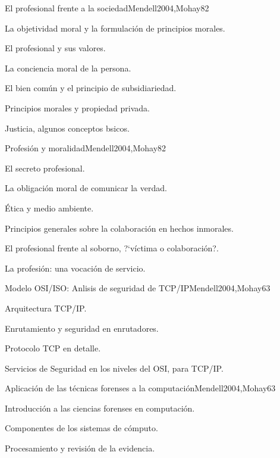\begin{syllabus}
\begin{unit}{El profesional frente a la sociedad}{Mendell2004,Mohay}{8}{2}
\begin{topics}
      \item {La objetividad moral y la formulación de principios morales.}
      \item {El profesional y sus valores.}
      \item {La conciencia moral de la persona.}
      \item {El bien común y el principio de subsidiariedad.}
      \item {Principios morales y propiedad privada.}
      \item {Justicia, algunos conceptos bsicos.}
\end{topics}
\end{unit}

\begin{unit}{Profesión y moralidad}{Mendell2004,Mohay}{8}{2}
\begin{topics}
      \item {El secreto profesional.}
      \item {La obligación moral de comunicar la verdad.}
      \item {Ética y medio ambiente.}
      \item {Principios generales sobre la colaboración en hechos inmorales.}
      \item {El profesional frente al soborno, ?`víctima o colaboración?.}
      \item {La profesión: una vocación de servicio.}
\end{topics}
\end{unit}

\begin{unit}{Modelo OSI/ISO: Anlisis de seguridad de TCP/IP}{Mendell2004,Mohay}{6}{3}
\begin{topics}
      \item {Arquitectura TCP/IP.}
      \item {Enrutamiento y seguridad en enrutadores.}
      \item {Protocolo TCP en detalle.}
      \item {Servicios de Seguridad en los niveles del OSI, para TCP/IP.}
\end{topics}
\end{unit}

\begin{unit}{Aplicación de las técnicas forenses a la computación}{Mendell2004,Mohay}{6}{3}
\begin{topics}
      \item {Introducción a las ciencias forenses en computación.}
      \item {Componentes de los sistemas de cómputo.}
      \item {Procesamiento y revisión de la evidencia.}
\end{topics}
\end{unit}


\end{syllabus}
